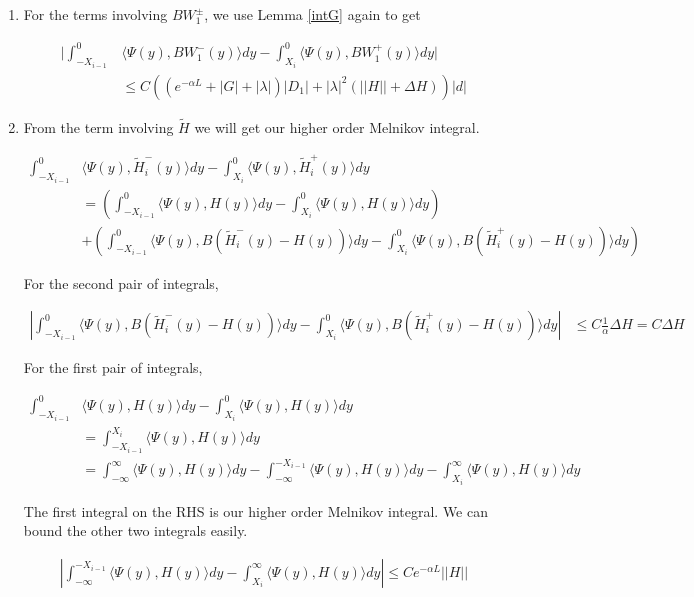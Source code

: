 \documentclass[12pt]{article}
\begin{document}
\begin{enumerate}
\item For the terms involving $B W_1^\pm$, we use Lemma \ref{intG} again to get

\begin{align*}
\Big| \int_{-X_{i-1}}^0 &\langle \Psi(y), B W_1^-(y) \rangle dy - \int_{X_i}^0 \langle \Psi(y), B W_1^+(y) \rangle dy \Big| \\
&\leq C \left( \left(e^{-\alpha L} + |G| + |\lambda|  \right) |D_1| + |\lambda|^2 \left(||H|| + \Delta H\right) \right)|d|
\end{align*}

\item From the term involving $\tilde{H}$ we will get our higher order Melnikov integral.

\begin{align*}
\int_{-X_{i-1}}^0 &\langle \Psi(y), \tilde{H}_i^-(y) \rangle dy - \int_{X_i}^0 \langle \Psi(y), \tilde{H}_i^+(y) \rangle dy \\
&= \left( \int_{-X_{i-1}}^0 \langle \Psi(y), H(y) \rangle dy - \int_{X_i}^0 \langle \Psi(y), H(y) \rangle dy \right) \\
&+ \left( \int_{-X_{i-1}}^0 \langle \Psi(y), B (\tilde{H}_i^-(y) - H(y)) \rangle dy - \int_{X_i}^0 \langle \Psi(y), B (\tilde{H}_i^+(y) - H(y)) \rangle dy \right) 
\end{align*}

For the second pair of integrals,

\begin{align*}
\left| \int_{-X_{i-1}}^0 \langle \Psi(y), B (\tilde{H}_i^-(y) - H(y)) \rangle dy - \int_{X_i}^0 \langle \Psi(y), B (\tilde{H}_i^+(y) - H(y)) \rangle dy \right| &\leq C \frac{1}{\alpha} \Delta H = C \Delta H
\end{align*}

For the first pair of integrals,

\begin{align*}
\int_{-X_{i-1}}^0 &\langle \Psi(y), H(y) \rangle dy - \int_{X_i}^0 \langle \Psi(y), H(y) \rangle dy \\
&= \int_{-X_{i-1}}^{X_i} \langle \Psi(y), H(y) \rangle dy \\
&= \int_{-\infty}^{\infty} \langle \Psi(y), H(y) \rangle dy - \int_{-\infty}^{-X_{i-1}} \langle \Psi(y), H(y) \rangle dy - \int_{X_i}^{\infty} \langle \Psi(y), H(y) \rangle dy 
\end{align*}

The first integral on the RHS is our higher order Melnikov integral. We can bound the other two integrals easily.

\begin{align*}
\left| \int_{-\infty}^{-X_{i-1}} \langle \Psi(y), H(y) \rangle dy - \int_{X_i}^{\infty} \langle \Psi(y), H(y) \rangle dy \right| \leq C e^{-\alpha L}||H||
\end{align*}

\end{enumerate}
\end{document}
